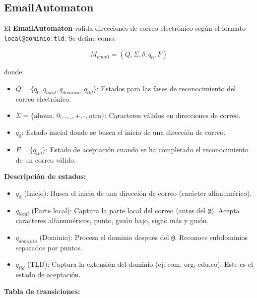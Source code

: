 \subsection{EmailAutomaton}

El \textbf{EmailAutomaton} valida direcciones de correo electrónico según el formato \texttt{local@dominio.tld}. Se define como:

\[
M_{email} = (Q, \Sigma, \delta, q_0, F)
\]

donde:
\begin{itemize}
    \item $Q = \{q_0, q_{local}, q_{dominio}, q_{tld}\}$: Estados para las fases de reconocimiento del correo electrónico.
    \item $\Sigma = \{\text{alnum}, \text{@}, \text{.}, \text{\_}, \text{+}, \text{-}, \text{otro}\}$: Caracteres válidos en direcciones de correo.
    \item $q_0$: Estado inicial donde se busca el inicio de una dirección de correo.
    \item $F = \{q_{tld}\}$: Estado de aceptación cuando se ha completado el reconocimiento de un correo válido.
\end{itemize}

\textbf{Descripción de estados:}
\begin{itemize}
    \item $q_0$ (Inicio): Busca el inicio de una dirección de correo (carácter alfanumérico).
    \item $q_{local}$ (Parte local): Captura la parte local del correo (antes del \texttt{@}). Acepta caracteres alfanuméricos, punto, guión bajo, signo más y guión.
    \item $q_{dominio}$ (Dominio): Procesa el dominio después del \texttt{@}. Reconoce subdominios separados por puntos.
    \item $q_{tld}$ (TLD): Captura la extensión del dominio (ej: com, org, edu.co). Este es el estado de aceptación.
\end{itemize}

\textbf{Tabla de transiciones:}

